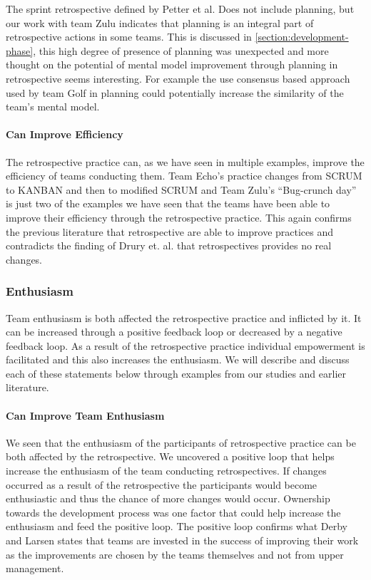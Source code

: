 The sprint retrospective defined by Petter et al. Does not include planning, but our work with team Zulu indicates that planning is an integral part of retrospective actions in some teams. This is discussed in \autoref{section:development-phase}, this high degree of presence of planning was unexpected and more thought on the potential of mental model improvement through planning in retrospective seems interesting. For example the use consensus based approach used by team Golf in planning could potentially increase the similarity of the team's mental model.

\paragraph{Can Improve Efficiency}
The retrospective practice can, as we have seen in multiple examples, improve the efficiency of teams conducting them. Team Echo's practice changes from SCRUM to KANBAN and then to modified SCRUM and Team Zulu's ``Bug-crunch day'' is just two of the examples we have seen that the teams have been able to improve their efficiency through the retrospective practice. This again confirms the previous literature \cite{Dingsoyr2004, Larsen2006, Kinoshita2008} that retrospective are able to improve practices and contradicts the finding of Drury et. al. \cite{Drury2012} that retrospectives provides no real changes.

\subsubsection{Enthusiasm}
\label{section:positive-loop-enthusiasm}
Team enthusiasm is both affected the retrospective practice and inflicted by it. It can be increased through a positive feedback loop or decreased by a negative feedback loop. As a result of the retrospective practice individual empowerment is facilitated and this also increases the enthusiasm. We will describe and discuss each of these statements below through examples from our studies and earlier literature. 

\paragraph{Can Improve Team Enthusiasm}
We seen that the enthusiasm of the participants of retrospective practice can be both affected by the retrospective. We uncovered a positive loop that helps increase the enthusiasm of the team conducting retrospectives. If changes occurred as a result of the retrospective the participants would become enthusiastic and thus the chance of more changes would occur. Ownership towards the development process was one factor that could help increase the enthusiasm and feed the positive loop. The positive loop confirms what Derby and Larsen \cite{Larsen2006} states that teams are invested in the success of improving their work as the improvements are chosen by the teams themselves and not from upper management. 

